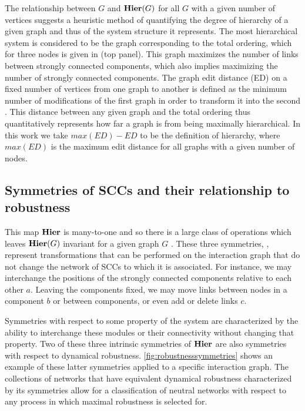 The relationship between $G$ and $\mathbf{Hier}(G)$ for all $G$ with a given number of vertices suggests a heuristic method of quantifying the degree of hierarchy of a given graph and thus of the system structure it represents. The most hierarchical system is considered to be the graph corresponding to the total ordering, which for three nodes is given in  (top panel). This graph maximizes the number of links between strongly connected components, which also implies maximizing the number of strongly connected components. The graph edit distance (ED) on a fixed number of vertices from one graph to another is defined as the minimum number of modifications of the first graph in order to transform it into the second \cite{Axenovich2011}. This distance between any given graph and the total ordering thus quantitatively represents how far a graph is from being maximally hierarchical. In this work we take $max(ED) - ED$ to be the definition of hierarchy, where $max(ED)$ is the maximum edit distance for all graphs with a given number of nodes.

\subsection{Symmetries of SCCs and their relationship to robustness}
This map $\mathbf{Hier}$ is many-to-one and so there is a large class of
operations which leaves $\mathbf{Hier}(G)$ invariant for a given graph $G$ . These three symmetries, , represent transformations that can be performed on the interaction graph that do not change the network of SCCs to which it is associated.
For instance, we may interchange the positions of the strongly
connected components relative to each other $a$.  Leaving the components fixed, we may move links between nodes in a component $b$ or between components, or even add or delete links $c$.

Symmetries with respect to some property of the system are characterized by the ability to interchange these modules or their connectivity without changing that property. Two of these three intrinsic symmetries of $\mathbf{Hier}$ are also symmetries with respect to dynamical robustness. \ref{fig:robustnesssymmetries} shows an example of these latter symmetries applied to a specific interaction graph. The collections of networks that have equivalent dynamical robustness characterized by its symmetries allow for a classification of neutral networks with respect to any process in which maximal robustness is selected for.


